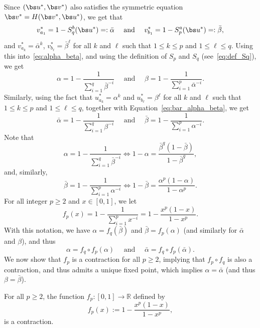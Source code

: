 Since $(\bs u^*,\bs v^*)$ also satisfies the symmetric equation $\bs v^* = H(\bs v^*, \bs u^*)$,
we get that
\begin{equation}\label{eq:bar_alpha_beta}
v^*_{a_1} = 1-S^{b}_q(\bs u^*)=:\bar\alpha
\quad\text{ and }\quad
v^*_{b_1} = 1-S^{ a}_p(\bs u^*)=:\bar\beta,
\end{equation}
and $v^*_{a_k} = \bar\alpha^k$,
$v^*_{b_\ell} = \bar\beta^\ell$ for all $k$ and $\ell$ such that $1\leq k\leq p$ and $1\leq\ell\leq q$.
Using this into~\eqref{eq:alpha_beta},
and using the definition of $S_p$ and $S_q$ (see~\eqref{eq:def_Sq}), we get
\[
\alpha = 1-\frac1{\sum_{i=1}^q \bar\beta^{-i}}
\quad\text{ and }\quad
\beta = 1-\frac1{\sum_{i=1}^p \bar\alpha^{-i}}.
\]
Similarly, using the fact that $u^*_{a_k} = \alpha^k$ and $u^*_{b_\ell} = \beta^\ell$ for all $k$ and $\ell$ such that $1\leq k\leq p$ and $1\leq\ell\leq q$, together with Equation~\eqref{eq:bar_alpha_beta}, we get
\[
\bar\alpha = 1-\frac1{\sum_{i=1}^q \beta^{-i}}
\quad\text{ and }\quad
\bar\beta = 1-\frac1{\sum_{i=1}^p \alpha^{-i}}.
\]
Note that
\begin{equation}\label{eq:first_equiv}
\alpha = 1-\frac1{\sum_{i=1}^q \bar\beta^{-i}}\iff
1-\alpha = \frac{\bar\beta^q(1-\bar\beta)}{1-\bar\beta^q},
\end{equation}
and, similarly,
\begin{equation}\label{eq:sec_equiv}
\bar\beta = 1-\frac1{\sum_{i=1}^p \alpha^{-i}}\iff
1-\bar\beta = \frac{\alpha^p(1-\alpha)}{1-\alpha^p}.
\end{equation}
For all integer $p\geq 2$ and $x\in [0,1]$, we let
\[
f_p(x) = 1-\frac1{\sum_{i=1}^p x^{-i}} = 1-\frac{x^p(1-x)}{1-x^p}.
\]
With this notation, we have $\alpha = f_q(\bar\beta)$ and $\bar\beta = f_p(\alpha)$ (and similarly for $\bar\alpha$ and $\beta$), and thus
\[
\alpha = f_q\circ f_p(\alpha) \quad\text{ and } \quad \bar\alpha = f_q\circ f_p(\bar\alpha).
\]
We now show that $f_p$ is a contraction for all $p\geq 2$,
implying that $f_p\circ f_q$ is also a contraction, and thus admits a unique fixed point,
which implies $\alpha = \bar\alpha$ (and thus $\beta = \bar\beta$).

\begin{lemma}\label{lem:contraction}
For all $p\geq 2$, the function $f_p\colon [0,1]\to \mathbb R$ defined by
\[
f_p(x) := 1-\frac{x^p(1-x)}{1-x^p},
\]
is a contraction.
\end{lemma}

